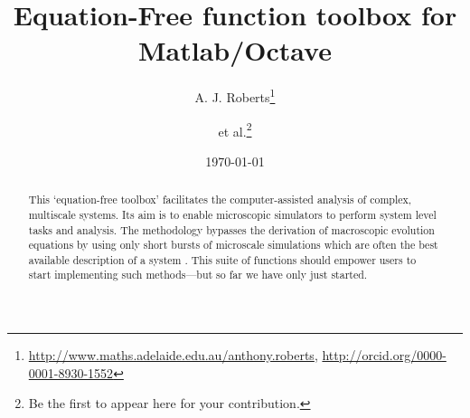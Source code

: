 \documentclass[11pt,a5paper,twoside]{article}
\title{Equation-Free function toolbox for Matlab/Octave}
\author{A. J. Roberts\thanks{%
\url{http://www.maths.adelaide.edu.au/anthony.roberts},
\url{http://orcid.org/0000-0001-8930-1552}}
\and et al.\thanks{Be the first to appear here for your contribution.}}
\date{\today}
\begin{document}

\maketitle

\begin{abstract}
This `equation-free toolbox' facilitates the computer-assisted analysis of complex, multiscale systems.
Its aim is to enable microscopic simulators to perform system level tasks and analysis.
The methodology bypasses the derivation of macroscopic evolution equations by using only short bursts of microscale simulations which are often the best available description of a system
\cite[e.g.]{Kevrekidis09a, Kevrekidis04a, Kevrekidis03b}.
This suite of functions should empower users to start implementing such methods---but so far we have only just started.
\end{abstract}

\tableofcontents









%

\appendix



\end{document}
